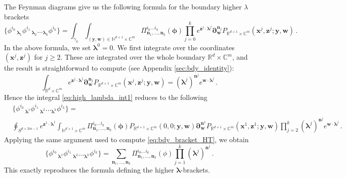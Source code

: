 \documentclass[11pt]{article}
\newcommand{\C}{\mathbb{C}}
\newcommand{\R}{\mathbb{R}}
\numberwithin{equation}{section}
\begin{document}
The Feynman diagrams give us the following formula for the boundary higher $\lambda$ brackets
\begin{equation}\label{eq:high_lambda_int1}
\{\phi^{i_0}\,_{\boldsymbol{\lambda}_1}\phi^{i_1}\,_{\boldsymbol{\lambda}_2}\dots_{\boldsymbol{\lambda}_k}\phi^{i_k}\} = \int_{\gamma_k}\int_{(\boldsymbol{y},\boldsymbol{w})\in \mathbb{H}^{d+1}\times \C^m} \Pi^{i_0\dots i_k}_{\boldsymbol{n}_1,\dots,\boldsymbol{n}_{k}}(\boldsymbol{\phi}) \prod_{j = 0}^k e^{\boldsymbol{z}^j\cdot\boldsymbol{\lambda}^j}\boldsymbol{\partial}_{\boldsymbol{w}}^{\boldsymbol{n}_j}P_{\R^{d+1}\times \C^m}(\boldsymbol{x}^j,\boldsymbol{z}^j;\boldsymbol{y},\boldsymbol{w}) \,.
\end{equation}
In the above formula, we set $\boldsymbol{\lambda}^0 = 0$. We first integrate over the coordinates $(\boldsymbol{x}^j,\boldsymbol{z}^j)$ for $j\geq 2$. These are integrated over the whole boundary $\R^d \times \C^m$, and the result is straightforward to compute (see Appendix \ref{sec:bdy_identity}):
\begin{equation}
	\int_{\R^d \times \C^m}  e^{\boldsymbol{z}^j\cdot\boldsymbol{\lambda}^j}\boldsymbol{\partial}_{\boldsymbol{w}}^{\boldsymbol{n}_j}P_{\R^{d+1}\times \C^m}(\boldsymbol{x}^j,\boldsymbol{z}^j;\boldsymbol{y},\boldsymbol{w}) = (\boldsymbol{\lambda}^{j})^{\boldsymbol{n}^j}e^{\boldsymbol{w}\cdot\boldsymbol{\lambda}^j}\,.
\end{equation}
Hence the integral \eqref{eq:high_lambda_int1} reduces to the following
\begin{equation}
\begin{aligned}
		&\{\phi^{i_0}\,_{\boldsymbol{\lambda}^1}\phi^{i_1}\,_{\boldsymbol{\lambda}^2}\dots_{\boldsymbol{\lambda}^k}\phi^{i_k}\} = \\
		& \oint_{S^{d+2m-1}}\!\! e^{\boldsymbol{z}^1\cdot \boldsymbol{\lambda}^1}\int_{\mathbb{H}^{d+1}\times \C^m} \Pi^{i_0\dots i_k}_{\boldsymbol{n}_1,\dots,\boldsymbol{n}_{k}}(\boldsymbol{\phi}) P_{\R^{d+1}\times \C^{m}}(0,0;\boldsymbol{y},\boldsymbol{w})\boldsymbol{\partial}^{\boldsymbol{n}^1}_{\boldsymbol{w}}P_{\R^{d+1}\times \C^{m}}(\boldsymbol{x}^1,\boldsymbol{z}^1;\boldsymbol{y},\boldsymbol{w})  \prod_{j = 2}^k (\boldsymbol{\lambda}^{j})^{\boldsymbol{n}^j}e^{\boldsymbol{w}\cdot\boldsymbol{\lambda}^j} \,.
\end{aligned}
\end{equation}
Applying the same argument used to compute \eqref{eq:bdy_bracket_HT}, we obtain
\begin{equation}
\{\phi^{i_0}\,_{\boldsymbol{\lambda}^1}\phi^{i_1}\,_{\boldsymbol{\lambda}^2}\dots_{\boldsymbol{\lambda}^k}\phi^{i_k}\} = \sum_{\boldsymbol{n}_1,\dots,\boldsymbol{n}_k} \Pi^{i_0\dots i_k}_{\boldsymbol{n}_1,\dots,\boldsymbol{n}_{k}}( \phi )\prod_{j = 1}^k  (\boldsymbol{\lambda}^j)^{\boldsymbol{n}^j}\,.
\end{equation}
This exactly reproduces the formula defining the higher $\boldsymbol{\lambda}$-brackets.
\end{document}
